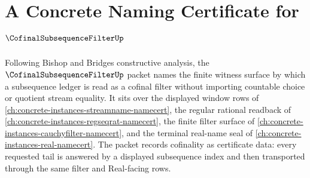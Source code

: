 \chapter{A Concrete Naming Certificate for $\CofinalSubsequenceFilterUp$}
\label{ch:concrete-instances-cofinal-subsequence-filter-namecert}

Following Bishop and Bridges constructive analysis, the $\CofinalSubsequenceFilterUp$ packet names the finite witness surface by which a subsequence ledger is read as a cofinal filter without importing countable choice or quotient stream equality. It sits over the displayed window rows of \autoref{ch:concrete-instances-streamname-namecert}, the regular rational readback of \autoref{ch:concrete-instances-regseqrat-namecert}, the finite filter surface of \autoref{ch:concrete-instances-cauchyfilter-namecert}, and the terminal real-name seal of \autoref{ch:concrete-instances-real-namecert}. The packet records cofinality as certificate data: every requested tail is answered by a displayed subsequence index and then transported through the same filter and Real-facing rows.

